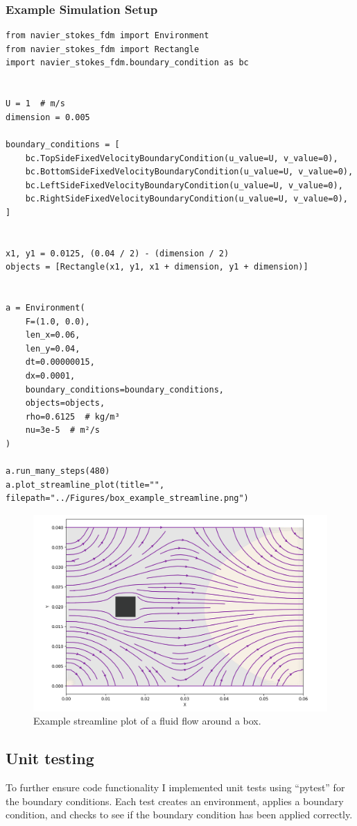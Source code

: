\subsubsection{Example Simulation Setup}
\begin{verbatim}
from navier_stokes_fdm import Environment
from navier_stokes_fdm import Rectangle
import navier_stokes_fdm.boundary_condition as bc


U = 1  # m/s
dimension = 0.005

boundary_conditions = [
    bc.TopSideFixedVelocityBoundaryCondition(u_value=U, v_value=0),
    bc.BottomSideFixedVelocityBoundaryCondition(u_value=U, v_value=0),
    bc.LeftSideFixedVelocityBoundaryCondition(u_value=U, v_value=0),
    bc.RightSideFixedVelocityBoundaryCondition(u_value=U, v_value=0),
]


x1, y1 = 0.0125, (0.04 / 2) - (dimension / 2)
objects = [Rectangle(x1, y1, x1 + dimension, y1 + dimension)]


a = Environment(
    F=(1.0, 0.0),
    len_x=0.06,
    len_y=0.04,
    dt=0.00000015,
    dx=0.0001,
    boundary_conditions=boundary_conditions,
    objects=objects,
    rho=0.6125  # kg/m³
    nu=3e-5  # m²/s
)

a.run_many_steps(480)
a.plot_streamline_plot(title="", filepath="../Figures/box_example_streamline.png")
\end{verbatim}

\begin{figure}[h]
    \centering
    \includegraphics[width=0.5\linewidth]{Figures/box_example_streamline.png}
    \caption{Example streamline plot of a fluid flow around a box.}
    \label{fig:box_example_streamline}
\end{figure}



\subsection{Unit testing}
To further ensure code functionality I implemented unit tests using ``pytest'' for the boundary conditions.
Each test creates an environment, applies a boundary condition, and checks to see if the boundary condition has been applied correctly.

